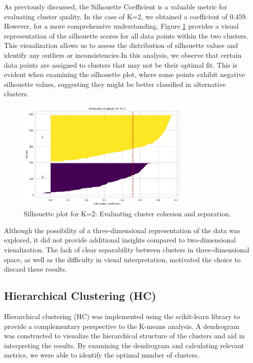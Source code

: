 \documentclass{llncs}
\begin{document}
 As previously discussed, the Silhouette Coefficient is a valuable metric for evaluating cluster quality. In the case of K=2, we obtained a coefficient of 0.459. However, for a more comprehensive understanding, Figure \ref*{fig:kmean_silhoete} provides a visual representation of the silhouette scores for all data points within the two clusters. This visualization allows us to assess the distribution of silhouette values and identify any outliers or inconsistencies.In this analysis, we observe that certain data points are assigned to clusters that may not be their optimal fit. This is evident when examining the silhouette plot, where some points exhibit negative silhouette values, suggesting they might be better classified in alternative clusters.
 
 \begin{figure}[h!]
 	\begin{center}  %
 		\includegraphics[width=0.75\textwidth]{images/silhouette_kmeans_PCA_with_2_components_ k=2.png}
 		\caption{Silhouette plot for K=2: Evaluating cluster cohesion and separation.}
 		\label{fig:kmean_silhoete}
 	\end{center}
 \end{figure}
 
 Although the possibility of a three-dimensional representation of the data was explored, it did not provide additional insights compared to two-dimensional visualization. The lack of clear separability between clusters in three-dimensional space, as well as the difficulty in visual interpretation, motivated the choice to discard these results.
 
 \subsection{Hierarchical Clustering (HC)}
 
Hierarchical clustering (HC) was implemented using the scikit-learn library to provide a complementary perspective to the K-means analysis. A dendrogram was constructed to visualize the hierarchical structure of the clusters and aid in interpreting the results. By examining the dendrogram and calculating relevant metrics, we were able to identify the optimal number of clusters.
\end{document}

